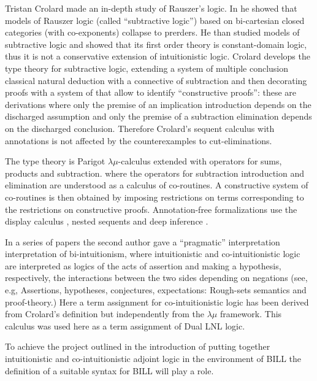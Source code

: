 {Tristan Crolard \cite{Crolard:2001,Crolard:2004} made an in-depth
study of Rauszer's logic. In \cite{Crolard:2001} he showed that models
of Rauszer logic (called ``subtractive logic'') based on bi-cartesian
closed categories (with co-exponents) collapse to prerders.  He than
studied models of subtractive logic and showed that its first order
theory is constant-domain logic, thus it is not a conservative
extension of intuitionistic logic.  Crolard \cite{Crolard:2004}
develops the type theory for subtractive logic, extending a system of
multiple conclusion classical natural deduction with a connective of
subtraction and then decorating proofs with a system of
\cite{annotationsofdependencies} that allow to identify ``constructive
proofs'': these are derivations where only the premise of an
implication introduction depends on the discharged assumption and only
the premise of a subtraction elimination depends on the discharged
conclusion. Therefore Crolard's sequent calculus with annotations is
not affected by the counterexamples to cut-eliminations.

The type theory is Parigot $\lambda\mu$-calculus extended with
operators for sums, products and subtraction.  where the operators for
subtraction introduction and elimination are understood as a calculus
of co-routines.  A constructive system of co-routines is then obtained
by imposing restrictions on terms corresponding to the restrictions on
constructive proofs.  Annotation-free formalizations use the display
calculus \cite{Gore:2000}, nested sequents \cite{GorePostnieceTiu:2008}
and deep inference \cite{Postniece:2009}.

In a series of papers the second author gave a ``pragmatic''
interpretation interpretation of bi-intuitionism, where intuitionistic
and co-intuitionistic logic are interpreted as logics of the acts of
assertion and making a hypothesis, respectively, the interactions
between the two sides depending on negations (see, e.g,
\cite{Bellin:2014} Assertions, hypotheses, conjectures, expectations:
Rough-sets semantics and proof-theory.)  Here a term assignment for
co-intuitionistic logic has been derived from Crolard's definition but
independently from the $\lambda\mu$ framework. This calculus was used
here as a term assignment of Dual LNL logic.


To achieve the project outlined in the introduction of putting
together intuitionistic and co-intuitionistic adjoint logic in the
environment of BILL the definition of a suitable syntax for BILL will
play a role.


}

